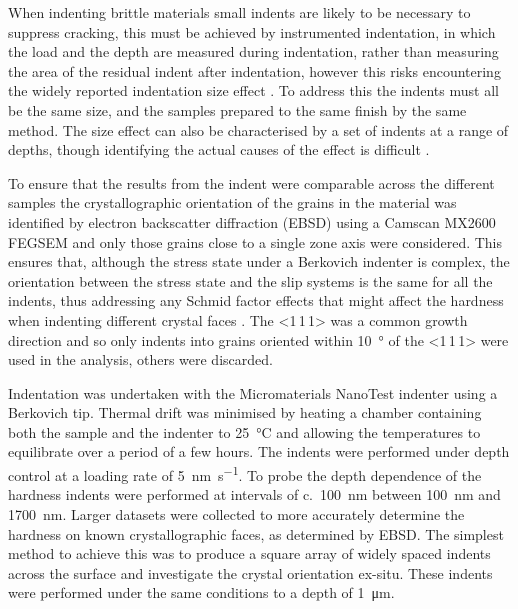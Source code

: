 When indenting brittle materials small indents are likely to be necessary to suppress cracking, this must be achieved by instrumented indentation, in which the load and the depth are measured during indentation, rather than measuring the area of the residual indent after indentation, however this risks encountering the widely reported indentation size effect \cite{Korte2009,Cripps2011}. To address this the indents must all be the same size, and the samples prepared to the same finish by the same method. The size effect can also be characterised by a set of indents at a range of depths, though identifying the actual causes of the effect is difficult \cite{Korte2009,Cripps2011}.


To ensure that the results from the indent were comparable across the different samples the crystallographic orientation of the grains in the material was identified by electron backscatter diffraction (EBSD) using a Camscan MX2600 FEGSEM and only those grains close to a single zone axis were considered. This ensures that, although the stress state under a Berkovich indenter is complex, the orientation between the stress state and the slip systems is the same for all the indents, thus addressing any Schmid factor effects that might affect the hardness when indenting different crystal faces \cite{Kelly2012ch7}. The <1\,1\,1> was a common growth direction and so only indents into grains oriented within \SI{10}{\degree} of the <1\,1\,1> were used in the analysis, others were discarded.


Indentation was undertaken with the Micromaterials NanoTest indenter using a Berkovich tip. Thermal drift was minimised by heating a chamber containing both the sample and the indenter to \SI{25}{\celsius} and allowing the temperatures to equilibrate over a period of a few hours. The indents were performed under depth control at a loading rate of \SI{5}{\nano\meter\per\second}. To probe the depth dependence of the hardness indents were performed at intervals of c.~\SI{100}{\nano\meter} between \SI{100}{\nano\meter} and \SI{1700}{\nano\meter}. Larger datasets were collected to more accurately determine the hardness on known crystallographic faces, as determined by EBSD. The simplest method to achieve this was to produce a square array of widely spaced indents across the surface and investigate the crystal orientation ex-situ. These indents were performed under the same conditions to a depth of \SI{1}{\micro\meter}.


